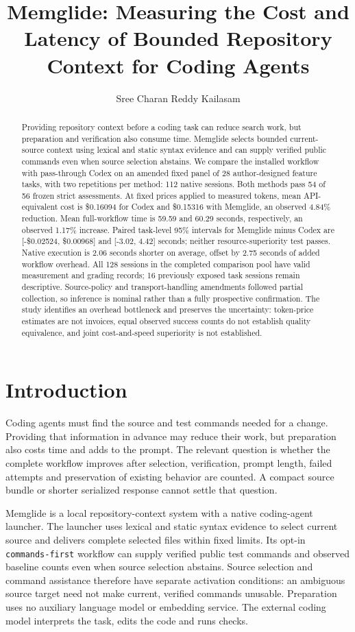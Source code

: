 \documentclass[manuscript,screen,nonacm]{acmart}
\title[Memglide: Bounded Repository Context]{Memglide: Measuring the
Cost and Latency of Bounded Repository Context for Coding Agents}
\author{Sree Charan Reddy Kailasam}
\begin{document}
\begin{abstract}
Providing repository context before a coding task can reduce search
work, but preparation and verification also consume time. Memglide
selects bounded current-source context using lexical and static syntax
evidence and can supply verified public commands even when source
selection abstains. We compare the installed workflow with pass-through
Codex on an amended fixed panel of 28 author-designed feature tasks,
with two repetitions per method: 112 native sessions. Both methods pass
54 of 56 frozen strict assessments. At fixed prices applied to measured
tokens, mean API-equivalent cost is \$0.16094 for Codex and \$0.15316
with Memglide, an observed 4.84\% reduction. Mean full-workflow time is
59.59 and 60.29 seconds, respectively, an observed 1.17\% increase.
Paired task-level 95\% intervals for Memglide minus Codex are
{[}-\$0.02524, \$0.00968{]} and {[}-3.02, 4.42{]} seconds; neither
resource-superiority test passes. Native execution is 2.06 seconds
shorter on average, offset by 2.75 seconds of added workflow overhead.
All 128 sessions in the completed comparison pool have valid measurement
and grading records; 16 previously exposed task sessions remain
descriptive. Source-policy and transport-handling amendments followed
partial collection, so inference is nominal rather than a fully
prospective confirmation. The study identifies an overhead bottleneck
and preserves the uncertainty: token-price estimates are not invoices,
equal observed success counts do not establish quality equivalence, and
joint cost-and-speed superiority is not established.
\end{abstract}
\maketitle
\section{Introduction}\label{introduction}

Coding agents must find the source and test commands needed for a
change. Providing that information in advance may reduce their work, but
preparation also costs time and adds to the prompt. The relevant
question is whether the complete workflow improves after selection,
verification, prompt length, failed attempts and preservation of
existing behavior are counted. A compact source bundle or shorter
serialized response cannot settle that question.

Memglide is a local repository-context system with a native coding-agent
launcher. The launcher uses lexical and static syntax evidence to select
current source and delivers complete selected files within fixed limits.
Its opt-in \texttt{commands-first} workflow can supply verified public
test commands and observed baseline counts even when source selection
abstains. Source selection and command assistance therefore have
separate activation conditions: an ambiguous source target need not make
current, verified commands unusable. Preparation uses no auxiliary
language model or embedding service. The external coding model
interprets the task, edits the code and runs checks.
\end{document}

